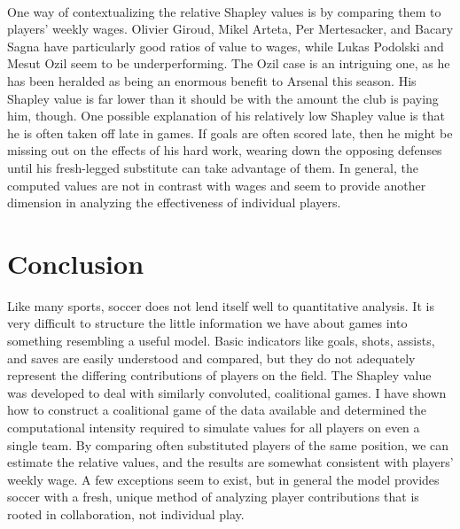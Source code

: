 \documentclass[a4paper,10pt]{article}
\newcommand{\br}{\\[10pt]}
\begin{document}
  \br
  One way of contextualizing the relative Shapley values is by comparing them to players' weekly wages. Olivier Giroud, Mikel Arteta, Per Mertesacker, and Bacary Sagna have particularly good ratios of value to wages, while Lukas Podolski and Mesut Ozil seem to be underperforming. The Ozil case is an intriguing one, as he has been heralded as being an enormous benefit to Arsenal this season. His Shapley value is far lower than it should be with the amount the club is paying him, though. One possible explanation of his relatively low Shapley value is that he is often taken off late in games. If goals are often scored late, then he might be missing out on the effects of his hard work, wearing down the opposing defenses until his fresh-legged substitute can take advantage of them. In general, the computed values are not in contrast with wages and seem to provide another dimension in analyzing the effectiveness of individual players.  
  
  \section*{Conclusion}
  Like many sports, soccer does not lend itself well to quantitative analysis. It is very difficult to structure the little information we have about games into something resembling a useful model. Basic indicators like goals, shots, assists, and saves are easily understood and compared, but they do not adequately represent the differing contributions of players on the field. The Shapley value was developed to deal with similarly convoluted, coalitional games. I have shown how to construct a coalitional game of the data available and determined the computational intensity required to simulate values for all players on even a single team. By comparing often substituted players of the same position, we can estimate the relative values, and the results are somewhat consistent with players' weekly wage. A few exceptions seem to exist, but in general the model provides soccer with a fresh, unique method of analyzing player contributions that is rooted in collaboration, not individual play. 
  
  \newpage
  
\end{document}
